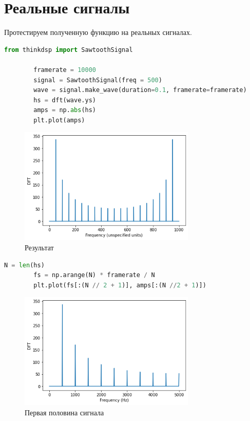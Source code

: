 \documentclass[a4paper, 12pt]{report}
\begin{document}
	\chapter{Реальные сигналы}
	Протестируем полученную функцию  на реальных сигналах.
	\begin{lstlisting}[language=Python,caption=Тест на реальном сигнале]
		from thinkdsp import SawtoothSignal

		framerate = 10000
		signal = SawtoothSignal(freq = 500)
		wave = signal.make_wave(duration=0.1, framerate=framerate)
		hs = dft(wave.ys)
		amps = np.abs(hs)
		plt.plot(amps)
	\end{lstlisting}
	\begin{figure}[H]
		\centering
		\includegraphics[width=0.75\textwidth]{task3.png}
		\caption{Результат}
		\label{fig:task3}
	\end{figure}
	\begin{lstlisting}[language=Python,caption=Берём левую половину сигнала]
		N = len(hs)
		fs = np.arange(N) * framerate / N
		plt.plot(fs[:(N // 2 + 1)], amps[:(N //2 + 1)])
	\end{lstlisting}
	\begin{figure}[H]
		\centering
		\includegraphics[width=0.75\textwidth]{task4.png}
		\caption{Первая половина сигнала}
		\label{fig:task4}
	\end{figure}
\end{document}
